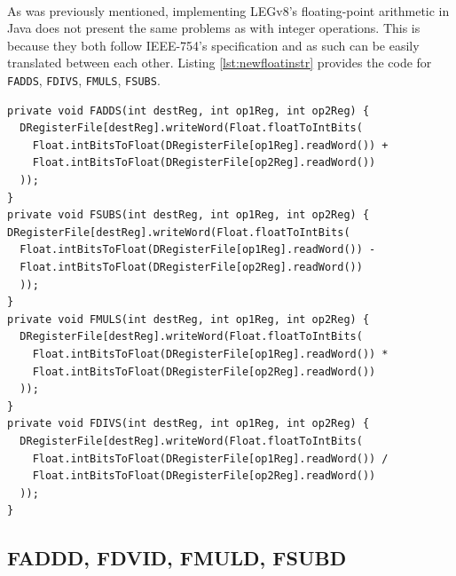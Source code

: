 \paragraph{}
As was previously mentioned, implementing LEGv8's floating-point arithmetic in Java does not present the same problems as with integer operations. This is because they both follow IEEE-754's \cite{ieee754} specification and as such can be easily translated between each other. Listing \ref{lst:newfloatinstr} provides the code for \verb|FADDS|, \verb|FDIVS|, \verb|FMULS|, \verb|FSUBS|.
\begin{lstlisting}[float, caption={New single-precision arithmetic instructions}, label={lst:newfloatinstr}]
private void FADDS(int destReg, int op1Reg, int op2Reg) {
  DRegisterFile[destReg].writeWord(Float.floatToIntBits(
    Float.intBitsToFloat(DRegisterFile[op1Reg].readWord()) +
    Float.intBitsToFloat(DRegisterFile[op2Reg].readWord())
  ));
}
private void FSUBS(int destReg, int op1Reg, int op2Reg) {
DRegisterFile[destReg].writeWord(Float.floatToIntBits(
  Float.intBitsToFloat(DRegisterFile[op1Reg].readWord()) -
  Float.intBitsToFloat(DRegisterFile[op2Reg].readWord())
  ));
}
private void FMULS(int destReg, int op1Reg, int op2Reg) {
  DRegisterFile[destReg].writeWord(Float.floatToIntBits(
    Float.intBitsToFloat(DRegisterFile[op1Reg].readWord()) *
    Float.intBitsToFloat(DRegisterFile[op2Reg].readWord())
  ));
}
private void FDIVS(int destReg, int op1Reg, int op2Reg) {
  DRegisterFile[destReg].writeWord(Float.floatToIntBits(
    Float.intBitsToFloat(DRegisterFile[op1Reg].readWord()) /
    Float.intBitsToFloat(DRegisterFile[op2Reg].readWord())
  ));
}
\end{lstlisting}
\subsection{FADDD, FDVID, FMULD, FSUBD}
